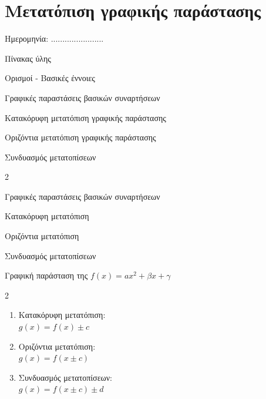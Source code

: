\documentclass[twoside,nofonts,internet,math,spyros]{frontisthrio}
\newcommand{\myitem}{\stepcounter{enumi}\item[\raisebox{0.5mm}{\faEdit}\ \Large$\square$]}
\begin{document}
\section{Μετατόπιση γραφικής παράστασης}
\begin{flushright}
\faCalendar* Ημερομηνία: .......................
\end{flushright}
\begin{mybox}[mysubtitle]{Πίνακας ύλης}
\begin{tcbraster}[raster columns=1,raster equal height]
\begin{myleftbox}{Ορισμοί - Βασικές έννοιες\ \ \faBook}
\begin{arithmisi}[itemsep=0mm]
\item Γραφικές παραστάσεις βασικών συναρτήσεων
\item Κατακόρυφη μετατόπιση γραφικής παράστασης
\item Οριζόντια μετατόπιση γραφικής παράστασης
\item Συνδυασμός μετατοπίσεων
\end{arithmisi}
\end{myleftbox}
\end{tcbraster}
\begin{multicols}{2}
\begin{todolist}[itemsep=0mm]
\myitem Γραφικές παραστάσεις βασικών συναρτήσεων
\item Κατακόρυφη μετατόπιση
\item Οριζόντια μετατόπιση
\item Συνδυασμός μετατοπίσεων
\item Γραφική παράσταση της $ f(x)=ax^2+\beta x+\gamma $
\end{todolist}
\end{multicols}
\begin{multicols}{2}
\begin{enumerate}[itemsep=0mm]
\item Κατακόρυφη μετατόπιση:\\
$ g(x)=f(x)\pm c $
\item Οριζόντια μετατόπιση:\\$ g(x)=f(x\pm c) $
\item Συνδυασμός μετατοπίσεων:\\$ g(x)=f(x\pm c)\pm d $
\end{enumerate}
\end{multicols}
\end{mybox}
\end{document}
